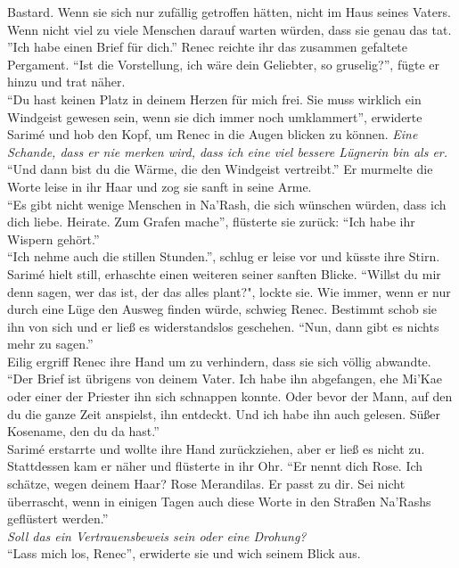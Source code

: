 Bastard. Wenn sie sich nur zufällig getroffen hätten, nicht im Haus seines Vaters. Wenn nicht viel 
zu viele Menschen darauf warten würden, dass sie genau das tat.\\
''Ich habe einen Brief für dich.'' Renec reichte ihr das zusammen gefaltete Pergament. ``Ist die 
Vorstellung, ich wäre dein Geliebter, so gruselig?'', fügte er hinzu und trat näher.\\
``Du hast keinen Platz in deinem Herzen für mich frei. Sie muss wirklich ein Windgeist gewesen 
sein, wenn sie dich immer noch umklammert'', erwiderte Sarimé und hob den Kopf, um Renec in die 
Augen blicken zu können. \textit{Eine Schande, dass er nie merken wird, dass ich eine viel 
bessere Lügnerin bin als er.}\\
``Und dann bist du die Wärme, die den Windgeist vertreibt.'' Er murmelte die Worte leise in ihr 
Haar und zog sie sanft in seine Arme.\\
``Es gibt nicht wenige Menschen in Na'Rash, die sich wünschen würden, dass ich dich liebe. Heirate. 
Zum Grafen mache'', flüsterte sie zurück: ``Ich habe ihr Wispern gehört.''\\
``Ich nehme auch die stillen Stunden.'', schlug er leise vor und küsste ihre Stirn.\\
Sarimé hielt still, erhaschte einen weiteren seiner sanften Blicke. ``Willst du mir denn sagen, 
wer das ist, der das alles plant?", lockte sie.
Wie immer, wenn er nur durch eine Lüge den Ausweg finden würde, schwieg Renec. Bestimmt schob sie 
ihn von sich und er ließ es widerstandslos geschehen. ``Nun, dann gibt es nichts mehr zu sagen.''\\
Eilig ergriff Renec ihre Hand um zu verhindern, dass sie sich völlig abwandte. ``Der Brief ist 
übrigens von deinem Vater. Ich habe ihn abgefangen, ehe Mi'Kae oder einer der Priester ihn sich 
schnappen konnte. Oder bevor der Mann, auf den du die ganze Zeit anspielst, ihn entdeckt. Und ich 
habe ihn auch gelesen. Süßer Kosename, den du da hast.''\\
Sarimé erstarrte und wollte ihre Hand zurückziehen, aber er ließ es nicht zu. Stattdessen kam er 
näher und flüsterte in ihr Ohr. ``Er nennt dich Rose. Ich schätze, wegen deinem Haar? Rose 
Merandilas. Er passt zu dir. Sei nicht überrascht, wenn in einigen Tagen auch diese Worte in den 
Straßen Na'Rashs geflüstert werden.''\\
\textit{Soll das ein Vertrauensbeweis sein oder eine Drohung?}\\
``Lass mich los, Renec'', erwiderte sie und wich seinem Blick aus.\\
